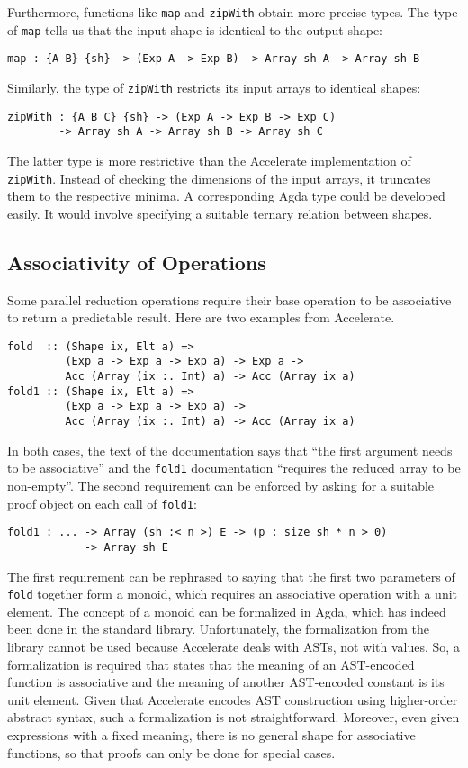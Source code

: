 \documentclass{llncs}
\begin{document}
Furthermore, functions like \texttt{map} and \texttt{zipWith} obtain
more precise types. The type of \texttt{map} tells us that the input
shape is identical to the output shape:
\begin{verbatim}
map : {A B} {sh} -> (Exp A -> Exp B) -> Array sh A -> Array sh B
\end{verbatim}
Similarly, the type of \texttt{zipWith} restricts its input arrays to
identical shapes:
\begin{verbatim}
zipWith : {A B C} {sh} -> (Exp A -> Exp B -> Exp C)
        -> Array sh A -> Array sh B -> Array sh C
\end{verbatim}
The latter type is more restrictive than the Accelerate
implementation of \texttt{zipWith}. Instead of checking the dimensions
of the input arrays, it truncates them to the respective minima. A
corresponding Agda type could be developed easily. It would involve
specifying a suitable ternary relation between shapes.

\subsection{Associativity of Operations}
\label{sec:assoc-oper}

Some parallel reduction operations require their base operation to be
associative to return a predictable result. Here are two examples from
Accelerate. 
\begin{verbatim}
fold  :: (Shape ix, Elt a) =>
         (Exp a -> Exp a -> Exp a) -> Exp a ->
         Acc (Array (ix :. Int) a) -> Acc (Array ix a)
fold1 :: (Shape ix, Elt a) =>
         (Exp a -> Exp a -> Exp a) ->
         Acc (Array (ix :. Int) a) -> Acc (Array ix a)
\end{verbatim}
In both cases, the text of the documentation says that ``the first
argument needs to be associative'' and the \texttt{fold1}
documentation ``requires the reduced array to be non-empty''.
The second requirement can be enforced by asking for a suitable proof
object on each call of \texttt{fold1}:
\begin{verbatim}
fold1 : ... -> Array (sh :< n >) E -> (p : size sh * n > 0)
            -> Array sh E
\end{verbatim}
The first requirement can be rephrased to saying that the first two
parameters of \texttt{fold} together form a monoid, which requires an
associative operation with a unit element. The concept of a monoid
can be formalized in Agda, which has indeed been done in the standard
library. Unfortunately, the formalization from the library cannot be
used because Accelerate deals with ASTs, not with values. So, a
formalization is required that states that the meaning of an
AST-encoded function is associative and the meaning of another
AST-encoded constant is its unit element. Given that Accelerate
encodes AST construction using higher-order abstract syntax, such a
formalization is not straightforward. Moreover, even given expressions
with a fixed meaning, there is no general shape for associative
functions, so that proofs can only be done for special cases. 
\end{document}
